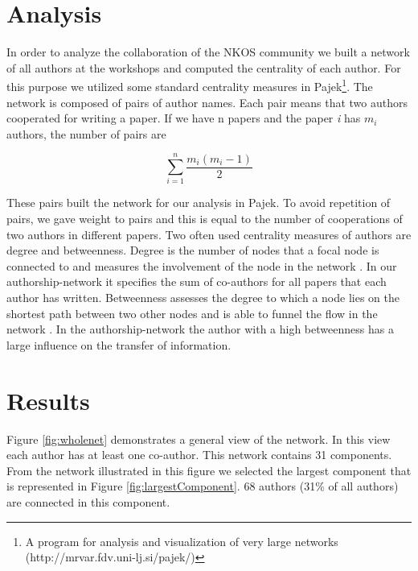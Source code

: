 \documentclass[runningheads,a4paper]{llncs}
\begin{document}


\section{Analysis}\label{analysis}

In order to analyze the collaboration of the NKOS community we built a network of all authors at the workshops and computed the centrality of each author. For this purpose we utilized some standard centrality measures in Pajek\footnote{A program for analysis and visualization of very large networks (http://mrvar.fdv.uni-lj.si/pajek/)}. The network is composed of pairs of author names. Each pair means that two authors cooperated for writing a paper. If we have n papers and the paper \textit{i} has $m_i$ authors, the number of pairs are 

\begin{equation}\sum\limits_{i=1}^n \frac{m_i(m_i-1)}{2}\end{equation}

These pairs built the network for our analysis in Pajek. To avoid repetition of pairs, we gave weight to pairs and this is equal to the number of cooperations of two authors in different papers. 
Two often used centrality measures of authors are degree and betweenness. Degree is the number of nodes that a focal node is connected to and measures the involvement of the node in the network \cite{Opsahl2010}. In our authorship-network it specifies the sum of co-authors for all papers that each author has written. Betweenness assesses the degree to which a node lies on the shortest path between two other nodes and is able to funnel the flow in the network \cite{Opsahl2010}. In the authorship-network the author with a high betweenness has a large influence on the transfer of information. 


\section{Results}\label{results}

Figure \ref{fig:wholenet} demonstrates a general view of the network. In this view each author has at least one co-author. This network contains 31 components. From the network illustrated in this figure we selected the largest component that is represented in Figure \ref{fig:largestComponent}. 68 authors (31\% of all authors) are connected in this component.
\end{document}
